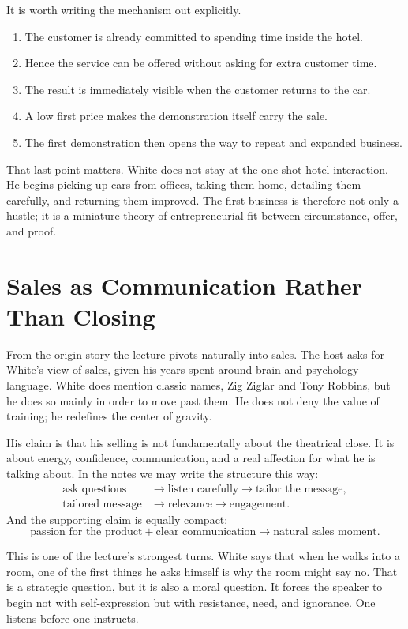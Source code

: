 It is worth writing the mechanism out explicitly.
\begin{enumerate}
\item The customer is already committed to spending time inside the hotel.
\item Hence the service can be offered without asking for extra customer time.
\item The result is immediately visible when the customer returns to the car.
\item A low first price makes the demonstration itself carry the sale.
\item The first demonstration then opens the way to repeat and expanded business.
\end{enumerate}
That last point matters. White does not stay at the one-shot hotel interaction. He begins picking up cars from offices, taking them home, detailing them carefully, and returning them improved. The first business is therefore not only a hustle; it is a miniature theory of entrepreneurial fit between circumstance, offer, and proof.

\section{Sales as Communication Rather Than Closing}

From the origin story the lecture pivots naturally into sales. The host asks for White's view of sales, given his years spent around brain and psychology language. White does mention classic names, Zig Ziglar and Tony Robbins, but he does so mainly in order to move past them. He does not deny the value of training; he redefines the center of gravity.

His claim is that his selling is not fundamentally about the theatrical close. It is about energy, confidence, communication, and a real affection for what he is talking about. In the notes we may write the structure this way:
\begin{align}
\text{ask questions} &\to \text{listen carefully} \to \text{tailor the message},\\
\text{tailored message} &\to \text{relevance} \to \text{engagement}.
\end{align}
And the supporting claim is equally compact:
\begin{equation}
\text{passion for the product}+\text{clear communication}
\to
\text{natural sales moment}.
\end{equation}

This is one of the lecture's strongest turns. White says that when he walks into a room, one of the first things he asks himself is why the room might say no. That is a strategic question, but it is also a moral question. It forces the speaker to begin not with self-expression but with resistance, need, and ignorance. One listens before one instructs.

